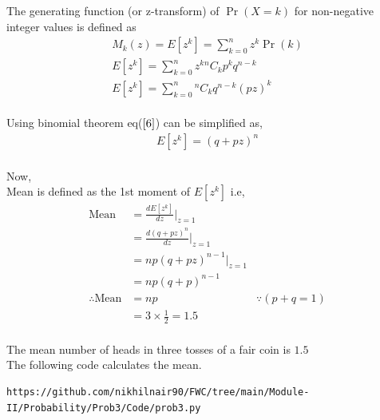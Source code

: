 \documentclass[journal,12pt,twocolumn]{IEEEtran}
\providecommand{\pr}[1]{\ensuremath{\Pr\left(#1\right)}}
\begin{document}
The generating function (or z-transform) of $\pr{X =k}$ for non-negative integer values is defined as 
\\
\begin{align}
&M_k(z) = E[z^{k}] = \sum_{k=0}^{n} z^{k} \pr{k}&
\\
&E[z^{k}] = \sum_{k=0}^{n} z^{k} {}^nC_kp^{k} q^{n-k}&
\\
&E[z^{k}] = \sum_{k=0}^{n} {}^nC_k  q^{n-k}(pz)^{k}&      \label{6}
\end{align}
\\
Using binomial theorem eq($\ref{6}$) can be simplified as,
\\
\begin{align}
E[z^{k}]= (q + pz)^n
\end{align}
\\
Now,\\
Mean is defined as the 1st moment of $E[z^{k}]$ i.e,
\begin{align}
\text{Mean}&= \frac{dE[z^{k}]}{dz}|_{z=1}&
\\
&= \frac{d(q + pz)^n}{dz}|_{z=1}&
\\
&=np(q + pz)^{n-1}|_{z=1}&
\\
&= np(q + p)^{n-1}&
\\
\therefore \text{Mean} &= np& {}\because(p+q=1)
\\
&= 3\times\frac{1}{2}= 1.5&
\end{align}
\\

The mean number of heads in three tosses of a fair coin is $1.5$
\\

The following code calculates the mean.

\begin{lstlisting}
https://github.com/nikhilnair90/FWC/tree/main/Module-II/Probability/Prob3/Code/prob3.py
\end{lstlisting}
\end{document}

